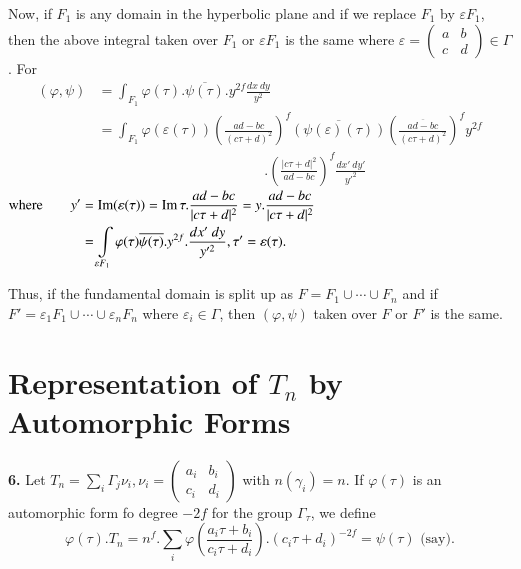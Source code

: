 Now, if $F_1$ is any domain in the hyperbolic plane and if we replace
$F_1$ by $\varepsilon F_1$, then the above integral taken over $F_1$
or $\varepsilon F_1$ is the same where $\varepsilon
= \begin{pmatrix}a&b\\ c&d \end{pmatrix}\in \Gamma $. For 
\begin{align*}
  (\varphi, \psi)&= \int_{F_1}\varphi (\tau). \overline {\psi
    (\tau)}. y^{2f} \frac{dx~dy}{y^2}\\ 
  &= \int_{F_1}\varphi (\varepsilon(\tau))
  \left(\frac{ad-bc}{(c\tau+d)^2}\right)^f \overline {(\psi
    (\varepsilon)(\tau))} 
  \left(\frac{\overline{ad-bc}}{(c \tau+d)^2}\right)^f y^{2f}\\
  & \hspace{5cm} .\left(\frac{|c \tau
    +d|^2}{ad-bc}\right)^f \frac {dx' ~dy'}{y'^2}  
\end{align*}
\noindent 
$
\begin{aligned}
\text{where}   \qquad  y' &= \operatorname{Im}(\varepsilon (\tau))=\operatorname{Im} \tau. \frac{ad-bc}{|c
    \tau +d|^2}=y.\frac{ad-bc}{|c \tau +d|^2}\\ 
  &=\int \limits _{\varepsilon F_1}\varphi (\tau)\overline{\psi
    (\tau)}. y^{2f}. \frac{dx' ~dy}{y'^2}, \tau '=\varepsilon (\tau). 
\end{aligned}
$\pageoriginale

Thus, if the fundamental domain is split up as $F=F_1 \cup \cdots \cup
F_n$ and if $F'=\varepsilon_1F_1 \cup \cdots \cup \varepsilon_n F_n$
where $\varepsilon_i \in
\Gamma$, then $(\varphi,\psi)$ taken over $F$ or $F'$ is the same. 

\section{Representation of \texorpdfstring{$T_n$}{Tn} by Automorphic
  Forms}\label{chap5:sec12}%

\textbf{6.} Let $T_n=\sum \limits _i \Gamma _j \nu_i, \nu_i =\begin{pmatrix}
a_i&b_i\\ c_i &d_i \end{pmatrix}$ with $n(\gamma_i)=n$. If $\varphi
(\tau)$ is an automorphic form fo degree $-2f$ for the group $\Gamma
_\tau$, we define 
$$
\varphi (\tau).T_n=n^f. \sum_i \varphi (\frac{a_i \tau +b_i}{c_i \tau
  +d_i}).(c_i \tau +d_i)^{-2f}=\psi (\tau)\text{ (say)}. 
$$

